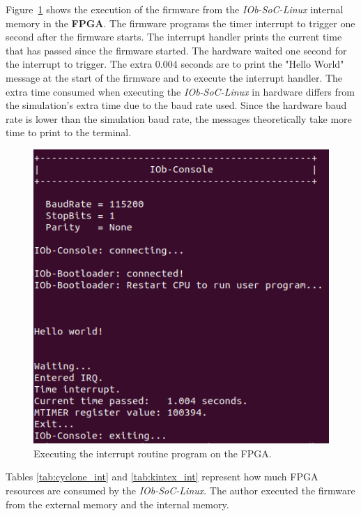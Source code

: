 Figure~\ref{fig:int_fpga} shows the execution of the firmware from the \textit{IOb-SoC-Linux} internal memory in the \textbf{FPGA}. The firmware programs the timer interrupt to trigger one second after the firmware starts. The interrupt handler prints the current time that has passed since the firmware started. The hardware waited one second for the interrupt to trigger. The extra 0.004 seconds are to print the "Hello World" message at the start of the firmware and to execute the interrupt handler. The extra time consumed when executing the \textit{IOb-SoC-Linux} in hardware differs from the simulation's extra time due to the baud rate used. Since the hardware baud rate is lower than the simulation baud rate, the messages theoretically take more time to print to the terminal.

\begin{figure}[!ht]
    \centering
    \includegraphics[width=\linewidth]{../images/int_fpga.png}
    \caption{Executing the interrupt routine program on the FPGA.}
    \label{fig:int_fpga}
\end{figure}

Tables \ref{tab:cyclone_int} and \ref{tab:kintex_int} represent how much FPGA resources are consumed by the \textit{IOb-SoC-Linux}. The author executed the firmware from the external memory and the internal memory.

